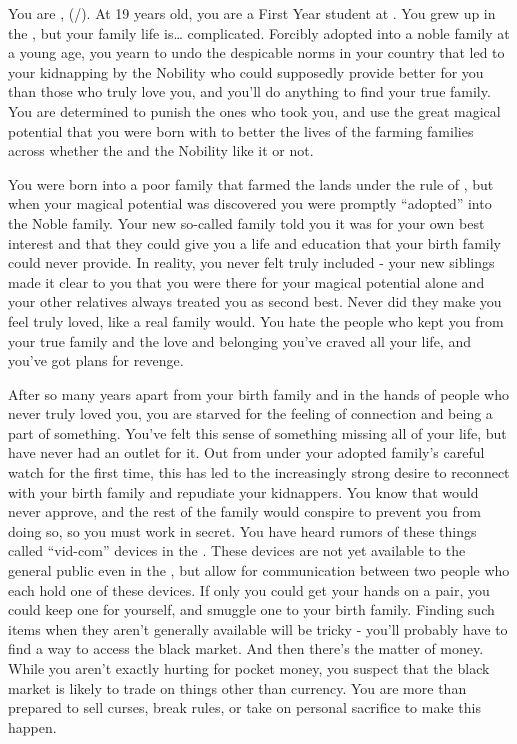 \documentclass[char]{GL2020}
\begin{document}
\name{\cAdopted{}}

You are \cAdopted{\full}, (\cAdopted{\they}/\cAdopted{\them}).  At 19 years old, you are a First Year student at \pSchool{}.  You grew up in the \pFarm{}, but your family life is\ldots{} complicated.  Forcibly adopted into a noble family at a young age, you yearn to undo the despicable norms in your country that led to your kidnapping by the Nobility who could supposedly provide better for you than those who truly love you, and you'll do anything to find your true family. You are determined to punish the ones who took you, and use the great magical potential that you were born with to better the lives of the farming families across \pFarm{} whether the \cQueen{\Majesty} and the Nobility like it or not.

You were born into a poor family that farmed the lands under the rule of \cAdoptedParentOne{\full}, but when your magical potential was discovered you were promptly ``adopted'' into the Noble \cAdoptedParentOne{\formal} family. Your new so-called family told you it was for your own best interest and that they could give you a life and education that your birth family could never provide.  In reality, you never felt truly included - your new siblings made it clear to you that you were there for your magical potential alone and your other relatives always treated you as second best. Never did they make you feel truly loved, like a real family would. You hate the people who kept you from your true family and the love and belonging you've craved all your life, and you've got plans for revenge.  

After so many years apart from your birth family and in the hands of people who never truly loved you, you are starved for the feeling of connection and being a part of something. You've felt this sense of something missing all of your life, but have never had an outlet for it. Out from under your adopted family's careful watch for the first time, this has led to the increasingly strong desire to reconnect with your birth family and repudiate your kidnappers. You know that \cAdoptedParentOne{} would never approve, and the rest of the family would conspire to prevent you from doing so, so you must work in secret. You have heard rumors of these things called ``vid-com'' devices in the \pTech{}. These devices are not yet available to the general public even in the \pTech{}, but allow for communication between two people who each hold one of these devices. If only you could get your hands on a pair, you could keep one for yourself, and smuggle one to your birth family. Finding such items when they aren't generally available will be tricky - you'll probably have to find a way to access the black market. And then there's the matter of money. While you aren't exactly hurting for pocket money, you suspect that the black market is likely to trade on things other than \pFarm{} currency. You are more than prepared to sell curses, break rules, or take on personal sacrifice to make this happen.
\end{document}
